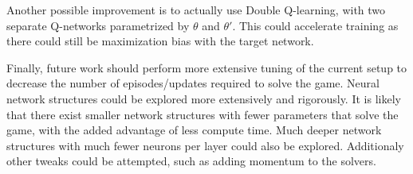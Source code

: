 \documentclass{article}
\begin{document}
Another possible improvement is to actually use Double Q-learning, with two separate Q-networks parametrized by $\theta$ and $\theta'$. This could accelerate training as there could still be maximization bias with the target network.

Finally, future work should perform more extensive tuning of the current setup to decrease the number of episodes/updates required to solve the game. Neural network structures could be explored more extensively and rigorously. It is likely that there exist smaller network structures with fewer parameters that solve the game, with the added advantage of less compute time. Much deeper network structures with much fewer neurons per layer could also be explored. Additionaly other tweaks could be attempted, such as adding momentum to the solvers.






\end{document}
